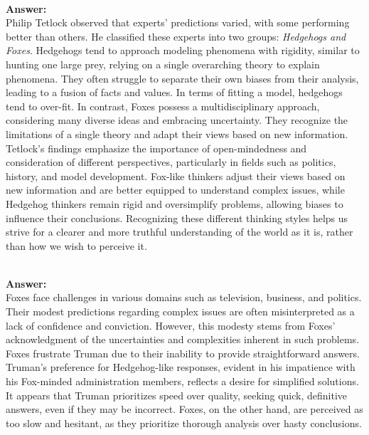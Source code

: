 \documentclass[12pt]{article}
\begin{document}


\begin{enumerate}

 \\
\textbf{Answer: } \\
Philip Tetlock observed that experts' predictions varied, with some performing better than others. He classified these experts into two groups: \textit{Hedgehogs and Foxes}. Hedgehogs tend to approach modeling phenomena with rigidity, similar to hunting one large prey, relying on a single overarching theory to explain phenomena. They often struggle to separate their own biases from their analysis, leading to a fusion of facts and values. In terms of fitting a model, hedgehogs tend to over-fit. In contrast, Foxes possess a multidisciplinary approach, considering many diverse ideas and embracing uncertainty. They recognize the limitations of a single theory and adapt their views based on new information. Tetlock's findings emphasize the importance of open-mindedness and consideration of different perspectives, particularly in fields such as politics, history, and model development. Fox-like thinkers adjust their views based on new information and are better equipped to understand complex issues, while Hedgehog thinkers remain rigid and oversimplify problems, allowing biases to influence their conclusions. Recognizing these different thinking styles helps us strive for a clearer and more truthful understanding of the world as it is, rather than how we wish to perceive it.

 \\
\textbf{Answer: } \\

Foxes face challenges in various domains such as television, business, and politics. Their modest predictions regarding complex issues are often misinterpreted as a lack of confidence and conviction. However, this modesty stems from Foxes' acknowledgment of the uncertainties and complexities inherent in such problems. Foxes frustrate Truman due to their inability to provide straightforward answers. Truman's preference for Hedgehog-like responses, evident in his impatience with his Fox-minded administration members, reflects a desire for simplified solutions. It appears that Truman prioritizes speed over quality, seeking quick, definitive answers, even if they may be incorrect. Foxes, on the other hand, are perceived as too slow and hesitant, as they prioritize thorough analysis over hasty conclusions.





\end{enumerate}
\end{document}
